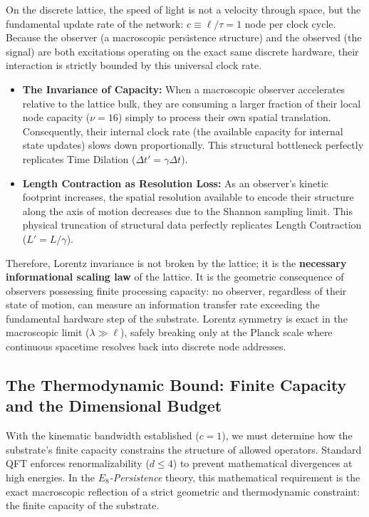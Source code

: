 On the discrete lattice, the speed of light is not a velocity through space, but the fundamental update rate of the network: $c \equiv \ell/\tau = 1$ node per clock cycle. Because the observer (a macroscopic persistence structure) and the observed (the signal) are both excitations operating on the exact same discrete hardware, their interaction is strictly bounded by this universal clock rate. 

\begin{itemize}
    \item \textbf{The Invariance of Capacity:} When a macroscopic observer accelerates relative to the lattice bulk, they are consuming a larger fraction of their local node capacity ($\nu=16$) simply to process their own spatial translation. Consequently, their internal clock rate (the available capacity for internal state updates) slows down proportionally. This structural bottleneck perfectly replicates Time Dilation ($\Delta t' = \gamma \Delta t$).
    \item \textbf{Length Contraction as Resolution Loss:} As an observer's kinetic footprint increases, the spatial resolution available to encode their structure along the axis of motion decreases due to the Shannon sampling limit. This physical truncation of structural data perfectly replicates Length Contraction ($L' = L/\gamma$).
\end{itemize}

Therefore, Lorentz invariance is not broken by the lattice; it is the \textbf{necessary informational scaling law} of the lattice. It is the geometric consequence of observers possessing finite processing capacity: no observer, regardless of their state of motion, can measure an information transfer rate exceeding the fundamental hardware step of the substrate. Lorentz symmetry is exact in the macroscopic limit ($\lambda \gg \ell$), safely breaking only at the Planck scale where continuous spacetime resolves back into discrete node addresses.

\subsection{The Thermodynamic Bound: Finite Capacity and the Dimensional Budget}
\label{subsec:mapping_rules}

With the kinematic bandwidth established ($c=1$), we must determine how the substrate's finite capacity constrains the structure of allowed operators. Standard QFT enforces renormalizability ($d \le 4$) to prevent mathematical divergences at high energies. In the \textit{$E_8$-Persistence} theory, this mathematical requirement is the exact macroscopic reflection of a strict geometric and thermodynamic constraint: the finite capacity of the substrate.

